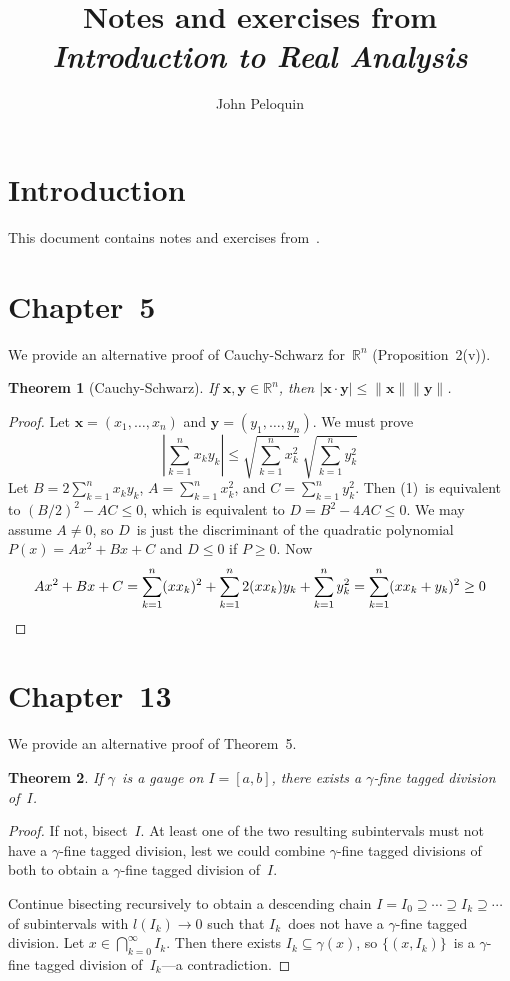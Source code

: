 \documentclass[letterpaper,12pt]{article}
\title{Notes and exercises from\\\textit{Introduction to Real Analysis}}
\author{John Peloquin}
\date{}
\newcommand{\R}{\mathbb{R}}
\newcommand{\bigsect}{\bigcap}
\newcommand{\abs}[1]{|{#1}|}
\newcommand{\bigabs}[1]{\left|{#1}\right|}
\newcommand{\norm}[1]{\lVert{#1}\rVert}
\renewcommand{\vec}[1]{\boldsymbol{#1}}
\theoremstyle{plain}
\newtheorem*{thm}{Theorem}
\theoremstyle{definition}
\theoremstyle{remark}
\begin{document}
\maketitle

\section*{Introduction}
This document contains notes and exercises from~\cite{depree}.

\section*{Chapter~5}
We provide an alternative proof of Cauchy-Schwarz for~\(\R^n\) (Proposition~2(v)).
\begin{thm}[Cauchy-Schwarz]
If \(\vec{x},\vec{y}\in\R^n\), then \(\abs{\vec{x}\cdot\vec{y}}\le\norm{\vec{x}}\norm{\vec{y}}\).
\end{thm}
\begin{proof}
Let \(\vec{x}=(x_1,\ldots,x_n)\) and \(\vec{y}=(y_1,\ldots,y_n)\). We must prove
\[\bigabs{\sum_{k=1}^n x_ky_k}\le\sqrt{\sum_{k=1}^n x_k^2}\ \sqrt{\sum_{k=1}^n y_k^2}\tag{1}\]
Let \(B=2\sum_{k=1}^n x_ky_k\), \(A=\sum_{k=1}^n x_k^2\), and \(C=\sum_{k=1}^n y_k^2\). Then (1)~is equivalent to \((B/2)^2-AC\le 0\), which is equivalent to \(D=B^2-4AC\le 0\). We may assume \(A\ne 0\), so \(D\)~is just the discriminant of the quadratic polynomial \(P(x)=Ax^2+Bx+C\) and \(D\le 0\) if \(P\ge 0\). Now
\[Ax^2+Bx+C=\sum_{k=1}^n(xx_k)^2+\sum_{k=1}^n2(xx_k)y_k+\sum_{k=1}^ny_k^2=\sum_{k=1}^n(xx_k+y_k)^2\ge 0\qedhere\]
\end{proof}

\section*{Chapter~13}
We provide an alternative proof of Theorem~5.
\begin{thm}
If \(\gamma\)~is a gauge on \(I=[a,b]\), there exists a \(\gamma\)-fine tagged division of~\(I\).
\end{thm}
\begin{proof}
If not, bisect~\(I\). At least one of the two resulting subintervals must not have a \(\gamma\)-fine tagged division, lest we could combine \(\gamma\)-fine tagged divisions of both to obtain a \(\gamma\)-fine tagged division of~\(I\).

Continue bisecting recursively to obtain a descending chain \(I=I_0\supseteq\cdots\supseteq I_k\supseteq\cdots\) of subintervals with \(l(I_k)\to0\) such that \(I_k\)~does not have a \(\gamma\)-fine tagged division. Let \(x\in\bigsect_{k=0}^{\infty}I_k\). Then there exists \(I_k\subseteq\gamma(x)\), so \(\{(x,I_k)\}\)~is a \(\gamma\)-fine tagged division of~\(I_k\)---a contradiction.
\end{proof}
\end{document}
